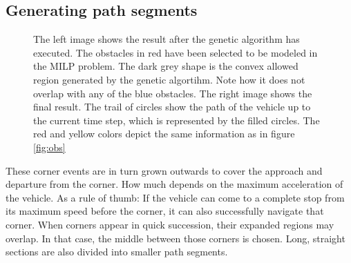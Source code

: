 \subsection{Generating path segments}
\begin{figure}[!t]
    \centering
    \hfil
    \caption{The left image shows the result after the genetic algorithm has executed. The obstacles in red have been selected to be modeled in the MILP problem. The dark grey shape is the convex allowed region generated by the genetic algortihm. Note how it does not overlap with any of the blue obstacles. The right image shows the final result. The trail of circles show the path of the vehicle up to the current time step, which is represented by the filled circles. The red and yellow colors depict the same information as in figure \ref{fig:obs}}\label{fig:pre-3-4}
\end{figure}
These corner events are in turn grown outwards to cover the approach and departure from the corner. How much depends on the maximum acceleration of the vehicle. As a rule of thumb: If the vehicle can come to a complete stop from its maximum speed before the corner, it can also successfully navigate that corner. When corners appear in quick succession, their expanded regions may overlap. In that case, the middle between those corners is chosen. Long, straight sections are also divided into smaller path segments.\\
